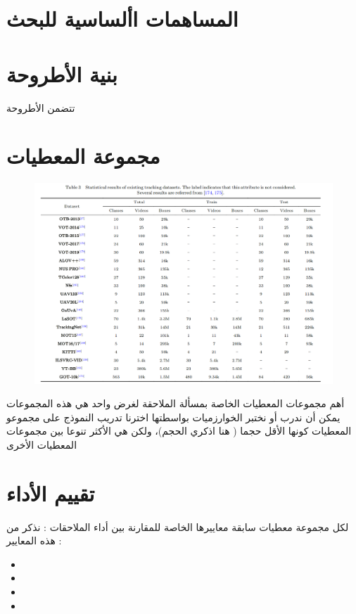 \documentclass[a4paper,1  pt]{report}
\begin{document}
\section{المساهمات األساسية للبحث}
\section{بنية الأطروحة}
تتضمن الأطروحة
\section{مجموعة المعطيات}

\begin{figure}[H]
    \centering
    \includegraphics[width=\textwidth]{images/table_dataset}
    \caption{\cite{Zhang21}}
\end{figure}
أهم مجموعات المعطيات الخاصة بمسألة الملاحقة لغرض واحد هي 
هذه المجموعات يمكن أن ندرب أو نختبر الخوارزميات بواسطتها
اخترنا تدريب النموذج على مجموعو المعطيات
كونها الأقل حجما ( هنا اذكري الحجم)، ولكن هي الأكثر تنوعا بين مجموعات المعطيات الأخرى
\section{تقييم الأداء}
لكل مجموعة معطيات سابقة معاييرها الخاصة للمقارنة بين أداء الملاحقات :
نذكر من هذه المعايير :
\begin{itemize}
  \item {}
  \item {}
  \item {}
  \item {}
  
  
\end{itemize}
\end{document}
